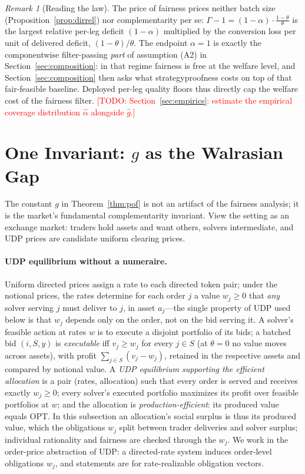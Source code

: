 \documentclass[11pt]{article}
\newcommand{\todo}[1]{\textcolor{red}{[TODO: #1]}}
\theoremstyle{remark}
\newtheorem{remark}{Remark}
\newcommand{\OPT}{\mathrm{OPT}}
\begin{document}
\begin{remark}[Reading the law]\label{rem:coveragereading}
The price of fairness prices neither batch size
(Proposition~\ref{prop:dirrel}) nor complementarity per se:
$\Gamma-1=(1-\alpha)\cdot\frac{1-\theta}{\theta}$ is the largest
relative per-leg deficit $(1-\alpha)$ multiplied by the conversion loss
per unit of delivered deficit, $(1-\theta)/\theta$. The endpoint
$\alpha=1$ is exactly the componentwise filter-passing \emph{part} of
assumption (A2) in Section~\ref{sec:composition}: in that regime
fairness is free at the welfare level, and Section~\ref{sec:composition}
then asks what strategyproofness costs on top of that fair-feasible
baseline. Deployed per-leg quality floors thus directly cap the welfare
cost of the fairness filter. \todo{Section~\ref{sec:empirics}: estimate
the empirical coverage distribution $\widehat\alpha$ alongside
$\widehat g$.}
\end{remark}

\section{One Invariant: \texorpdfstring{$g$}{g} as the Walrasian Gap}\label{sec:walras}

The constant $g$ in Theorem~\ref{thm:pof} is not an artifact of the fairness
analysis; it is the market's fundamental complementarity invariant. View the
setting as an exchange market: traders hold assets and want others, solvers
intermediate, and UDP prices are candidate uniform clearing prices.

\paragraph{UDP equilibrium without a numeraire.}
Uniform directed prices assign a rate to each directed token pair; under
the notional prices, the rates determine for each order $j$ a value
$w_j\ge0$ that \emph{any} solver serving $j$ must deliver to $j$, in asset
$a_j$---the single property of UDP used below is that $w_j$ depends only
on the order, not on the bid serving it. A solver's feasible action at
rates $w$ is to execute a disjoint portfolio of its bids; a batched bid
$(i,S,y)$ is \emph{executable} iff $v_j\ge w_j$ for every $j\in S$ (at
$\theta=0$ no value moves across assets), with profit
$\sum_{j\in S}(v_j-w_j)$, retained in the respective assets and compared
by notional value. A \emph{UDP equilibrium supporting the efficient
allocation} is a pair (rates, allocation) such that every order is served
and receives exactly $w_j\ge0$; every solver's executed portfolio
maximizes its profit over feasible portfolios at $w$; and the allocation
is \emph{production-efficient}: its produced value equals $\OPT$. In
this subsection an allocation's social surplus is thus its produced value,
which the obligations $w_j$ split between trader deliveries and solver
surplus; individual rationality and fairness are checked through the
$w_j$. We work in the order-price abstraction of UDP: a directed-rate
system induces order-level obligations $w_j$, and statements are for
rate-realizable obligation vectors.
\end{document}
